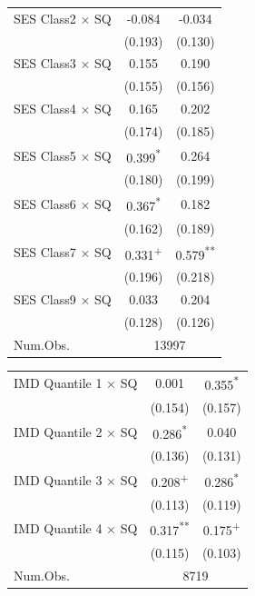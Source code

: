 \begin{table}[!htbp]
\centering\scriptsize
\begin{threeparttable}
\begin{tabular}{lcc}
\toprule
SES Class2 $\times$ SQ& -0.084 & -0.034 \\
 & (0.193) & (0.130) \\
SES Class3 $\times$ SQ& 0.155 & 0.190 \\
 & (0.155) & (0.156) \\
SES Class4 $\times$ SQ& 0.165 & 0.202 \\
 & (0.174) & (0.185) \\
SES Class5 $\times$ SQ& 0.399\textsuperscript{*} & 0.264 \\
 & (0.180) & (0.199) \\
SES Class6 $\times$ SQ& 0.367\textsuperscript{*} & 0.182 \\
 & (0.162) & (0.189) \\
SES Class7 $\times$ SQ& 0.331\textsuperscript{+} & 0.579\textsuperscript{**} \\
 & (0.196) & (0.218) \\
SES Class9 $\times$ SQ& 0.033 & 0.204 \\
 & (0.128) & (0.126) \\
\midrule
Num.Obs. & \multicolumn{2}{c}{13997 \quad 14006} \\
\bottomrule
\end{tabular}
\end{threeparttable}
\end{table}
\vspace{-6pt}

\begin{table}[!htbp]
\centering\scriptsize
\begin{threeparttable}
\begin{tabular}{lcc}
\midrule
IMD Quantile 1 $\times$ SQ& 0.001 & 0.355\textsuperscript{*} \\
 & (0.154) & (0.157) \\
IMD Quantile 2 $\times$ SQ& 0.286\textsuperscript{*} & 0.040 \\
 & (0.136) & (0.131) \\
IMD Quantile 3 $\times$ SQ& 0.208\textsuperscript{+} & 0.286\textsuperscript{*} \\
 & (0.113) & (0.119) \\
IMD Quantile 4 $\times$ SQ& 0.317\textsuperscript{**} & 0.175\textsuperscript{+} \\
 & (0.115) & (0.103) \\
\midrule
Num.Obs. & \multicolumn{2}{c}{8719 \quad 8759} \\
\bottomrule
\end{tabular}
\end{threeparttable}
\end{table}
\vspace{-6pt}

